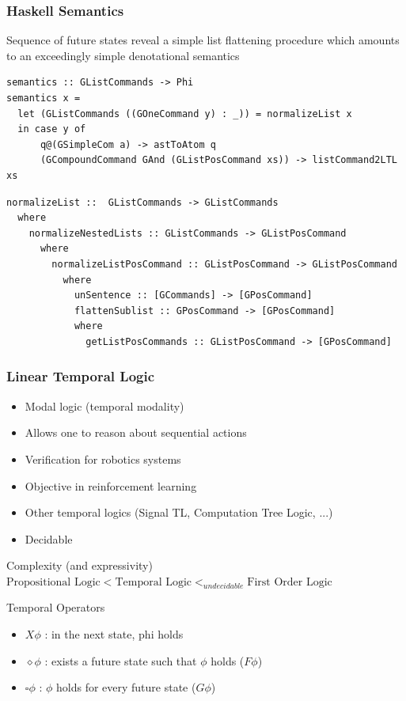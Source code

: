 \documentclass{beamer}
\begin{document}
\begin{frame}[fragile]
\frametitle{Haskell Semantics}
\fontsize{9pt}{10pt}\selectfont
\begin{block}{}
Sequence of future states reveal a simple list flattening procedure which
amounts to an exceedingly simple denotational semantics
\end{block}
\pause
\begin{verbatim}
semantics :: GListCommands -> Phi
semantics x =
  let (GListCommands ((GOneCommand y) : _)) = normalizeList x
  in case y of
      q@(GSimpleCom a) -> astToAtom q
      (GCompoundCommand GAnd (GListPosCommand xs)) -> listCommand2LTL xs
\end{verbatim}
\pause
\begin{verbatim}
normalizeList ::  GListCommands -> GListCommands
  where
    normalizeNestedLists :: GListCommands -> GListPosCommand
      where
        normalizeListPosCommand :: GListPosCommand -> GListPosCommand
          where
            unSentence :: [GCommands] -> [GPosCommand]
            flattenSublist :: GPosCommand -> [GPosCommand]
            where
              getListPosCommands :: GListPosCommand -> [GPosCommand]
\end{verbatim}
\end{frame}





\begin{frame}
\frametitle{Linear Temporal Logic}
\begin{itemize}
\item Modal logic (temporal modality)
\item Allows one to reason about sequential actions
\item Verification for robotics systems
\item Objective in reinforcement learning
\item Other temporal logics (Signal TL, Computation Tree Logic, ...)
\item Decidable 
\end{itemize}

\begin{block}{Complexity (and expressivity)}
$\text{Propositional Logic} < \text{Temporal Logic} <_{undecidable} \text{First Order Logic}$
\end{block}

\begin{exampleblock}{Temporal Operators}
\begin{itemize}
\item $X \phi$ : in the next state, phi holds
\item $\diamond \phi$ : exists a future state such that $\phi$ holds ($F \phi$)
\item $\square \phi$ : $\phi$ holds for every future state ($G \phi$)
\end{itemize}
\end{exampleblock}

\end{frame}
\end{document}
